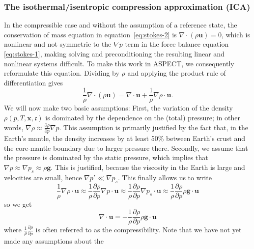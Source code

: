 \documentclass{article}
\newcommand{\aspect}{\textsc{ASPECT}}
\begin{document}
\subsubsection{The isothermal/isentropic compression approximation (ICA)}
\label{sec:ica}

In the compressible case and without the assumption of a reference state, 
the conservation of mass equation in equation~\eqref{eq:stokes-2} is $\nabla 
\cdot \left( \rho \textbf{u} \right)= 0$, which is nonlinear and not symmetric to the $\nabla p$ term in the
force balance equation \eqref{eq:stokes-1}, making solving and preconditioning
the resulting linear and nonlinear systems difficult. To make this work in
\aspect{}, we consequently reformulate this equation. Dividing by $\rho$ and
applying the product rule of differentiation gives
\begin{equation*}
\frac{1}{\rho} \nabla \cdot \left( \rho \textbf{u} \right) = \nabla \cdot \textbf{u} + \frac{1}{\rho} \nabla \rho \cdot  \textbf{u}.
\end{equation*}
We will now make two basic assumptions: First, the variation of the density
$\rho(p,T,\mathbf x, \mathfrak c)$ is dominated by the dependence on the
(total) pressure; in other words, $\nabla \rho \approx \frac{\partial \rho}{\partial
  p}\nabla p$. This assumption is primarily justified by the fact that, in the
Earth's mantle, the density increases by at least 50\% between Earth's crust and
the core-mantle boundary due to larger pressure there. Secondly, we assume
that the pressure is dominated by the static pressure, which implies that
$\nabla p \approx \nabla p_s \approx \rho \textbf{g}$. This is justified, 
because the viscosity in the Earth is large and velocities are small, 
hence $\nabla p' \ll \nabla p_s$.
This finally allows us to write
\begin{equation*}
\frac{1}{\rho} \nabla \rho \cdot \textbf{u} \approx \frac{1}{\rho} \frac{\partial \rho}{\partial p} \nabla p \cdot \textbf{u} \approx \frac{1}{\rho} \frac{\partial \rho}{\partial p} \nabla p_s \cdot \textbf{u} \approx \frac{1}{\rho} \frac{\partial \rho}{\partial p} \rho \textbf{g} \cdot \textbf{u} 
\end{equation*}
so we get
\begin{equation}
\label{eq:stokes-2-compressible}
\nabla \cdot \textbf{u} = - \frac{1}{\rho} \frac{\partial \rho}{\partial p} \rho \textbf{g} \cdot \textbf{u}
\end{equation}
where $\frac{1}{\rho} \frac{\partial \rho}{\partial p}$ is often referred to
as the compressibility. Note that we have not yet made any assumptions about the
\end{document}
